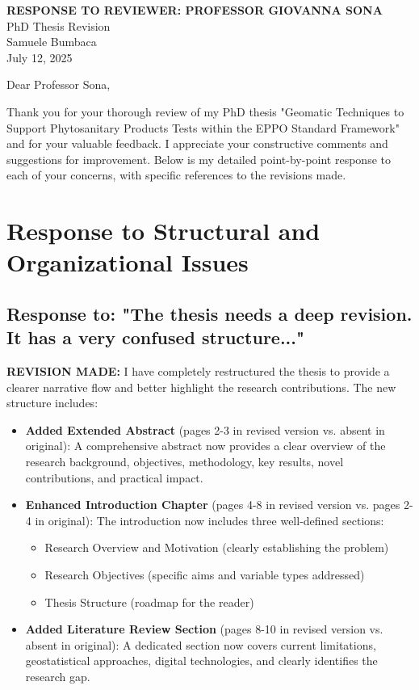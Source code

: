 \documentclass[11pt,a4paper]{article}
\begin{document}
\begin{center}
{\LARGE\bfseries RESPONSE TO REVIEWER: PROFESSOR GIOVANNA SONA}\\[0.5cm]
{\large PhD Thesis Revision}\\[0.3cm]
{\normalsize Samuele Bumbaca}\\[0.2cm]
{\normalsize July 12, 2025}
\end{center}

\vspace{1cm}

Dear Professor Sona,

Thank you for your thorough review of my PhD thesis "Geomatic Techniques to Support Phytosanitary Products Tests within the EPPO Standard Framework" and for your valuable feedback. I appreciate your constructive comments and suggestions for improvement. Below is my detailed point-by-point response to each of your concerns, with specific references to the revisions made.

\section{Response to Structural and Organizational Issues}

\subsection{Response to: "The thesis needs a deep revision. It has a very confused structure..."}

\textbf{REVISION MADE:} I have completely restructured the thesis to provide a clearer narrative flow and better highlight the research contributions. The new structure includes:

\begin{itemize}
\item \textbf{Added Extended Abstract} (pages 2-3 in revised version vs. absent in original): A comprehensive abstract now provides a clear overview of the research background, objectives, methodology, key results, novel contributions, and practical impact.

\item \textbf{Enhanced Introduction Chapter} (pages 4-8 in revised version vs. pages 2-4 in original): The introduction now includes three well-defined sections:
\begin{itemize}
\item Research Overview and Motivation (clearly establishing the problem)
\item Research Objectives (specific aims and variable types addressed)
\item Thesis Structure (roadmap for the reader)
\end{itemize}

\item \textbf{Added Literature Review Section} (pages 8-10 in revised version vs. absent in original): A dedicated section now covers current limitations, geostatistical approaches, digital technologies, and clearly identifies the research gap.
\end{itemize}
\end{document}
